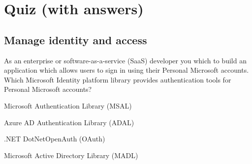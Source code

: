 \section{Quiz (with answers)}
\subsection{Manage identity and access}
As an enterprise or software-as-a-service (SaaS) developer you which to build an application which allows users to sign in using their Personal Microsoft accounts. Which Microsoft Identity platform library provides authentication tools for Personal Microsoft accounts?
\begin{todolist}
\item[\correct] Microsoft Authentication Library (MSAL)
\item[\incorrect] Azure AD Authentication Library (ADAL)
\item[\incorrect] .NET DotNetOpenAuth (OAuth)
\item[\incorrect] Microsoft Active Directory Library (MADL)
\end{todolist}